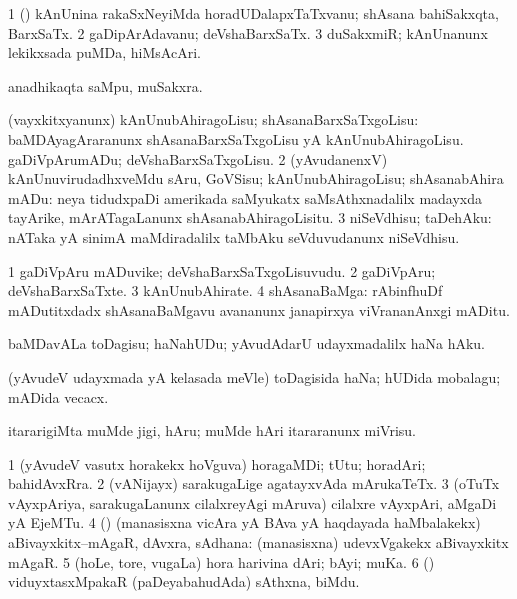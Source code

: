 \bentry
{}
\gl{\nA}
\bmng
\bnum
\num{1} (\ca) kAnUnina rakaSxNeyiMda horadUDalapxTaTxvanu; shAsana bahiSakxqta, BarxSaTx. 
\num{2} gaDipArAdavanu; deVshaBarxSaTx. 
\num{3} duSakxmiR; kAnUnanunx lekikxsada puMDa, hiMsAcAri. 
\enum
\emng

\noindent
\gl{\pagu}
\bmng
{} anadhikaqta saMpu, muSakxra. 
\emng
\eentry

\bentry
{}
\gl{\sakirx}
\bmng
\bnum
{} (vayxkitxyanunx) 
\banum
{} kAnUnubAhiragoLisu; shAsanaBarxSaTxgoLisu:  baMDAyagAraranunx shAsanaBarxSaTxgoLisu yA kAnUnubAhiragoLisu. 
 gaDiVpArumADu; deVshaBarxSaTxgoLisu. 
\eanum
\numie
\num{2} (yAvudanenxV) kAnUnuvirudadhxveMdu sAru, GoVSisu; kAnUnubAhiragoLisu; shAsanabAhira mADu:  neya tidudxpaDi amerikada saMyukatx saMsAthxnadalilx madayxda tayArike, mArATagaLanunx shAsanabAhiragoLisitu. 
\num{3} niSeVdhisu; taDehAku:  nATaka yA sinimA maMdiradalilx taMbAku seVduvudanunx niSeVdhisu. 
\enum
\emng
\eentry

\bentry
{}
\gl{\nA}
\bmng
\bnum
\num{1} gaDiVpAru mADuvike; deVshaBarxSaTxgoLisuvudu. 
\num{2} gaDiVpAru; deVshaBarxSaTxte. 
\num{3} kAnUnubAhirate. 
\num{4} shAsanaBaMga:  rAbinfhuDf mADutitxdadx shAsanaBaMgavu avananunx janapirxya viVrananAnxgi mADitu. 
\enum
\emng
\eentry

\bentry
{}
\gl{\sakirx}
\bmng
baMDavALa toDagisu; haNahUDu; yAvudAdarU udayxmadalilx haNa hAku. 
\emng
\eentry

\bentry
{}
\gl{\nA}
\bmng
(yAvudeV udayxmada yA kelasada meVle) toDagisida haNa; hUDida mobalagu; mADida vecacx. 
\emng
\eentry

\bentry
{}
\gl{\sakirx}
\bmng
itararigiMta muMde jigi, hAru; muMde hAri itararanunx miVrisu. 
\emng
\eentry

\bentry
{}
\gl{\nA}
\bmng
\bnum
\num{1} (yAvudeV vasutx horakekx hoVguva) horagaMDi; tUtu; horadAri; bahidAvxRra. 
\num{2} (vANijayx) sarakugaLige agatayxvAda mArukaTeTx. 
\num{3} (oTuTx vAyxpAriya, sarakugaLanunx cilalxreyAgi mAruva) cilalxre vAyxpAri, aMgaDi yA EjeMTu. 
\num{4} (\rUpa) (manasisxna vicAra yA BAva yA haqdayada haMbalakekx) aBivayxkitx--mAgaR, dAvxra, sAdhana:  (manasisxna) udevxVgakekx aBivayxkitx mAgaR. 
\num{5} (hoLe, tore, \mo vugaLa) hora harivina dAri; bAyi; muKa. 
\num{6} (\ame) viduyxtasxMpakaR (paDeyabahudAda) sAthxna, biMdu. 
\enum
\emng
\eentry

